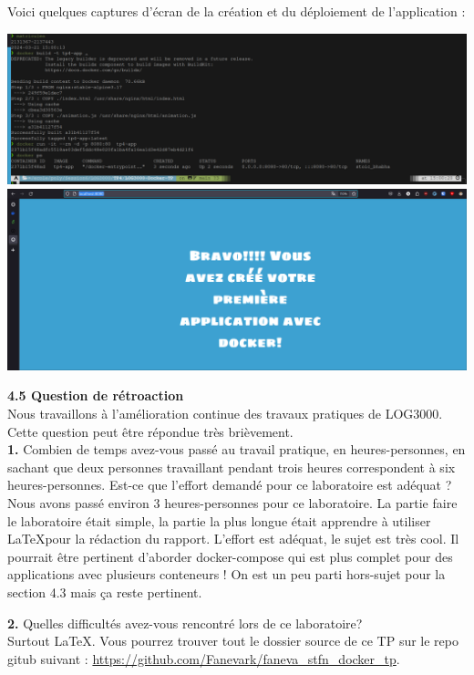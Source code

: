 \documentclass[12pt, letterpaper]{report}
\begin{document}
Voici quelques captures d'écran de la création et du déploiement de l'application : \\ 
\begin{center}
	\includegraphics[scale=0.25]{4.4-all.png} \\
	\includegraphics[scale=0.25]{4.4-app.png} \\
\end{center}
\newpage

\textbf{4.5 Question de rétroaction}\\
Nous travaillons à l’amélioration continue des travaux pratiques de LOG3000. Cette question peut être répondue très brièvement.\\
\textbf{1.} Combien de temps avez-vous passé au travail pratique, en heures-personnes, en sachant que deux personnes travaillant pendant trois heures correspondent à six heures-personnes. Est-ce que l'effort demandé pour ce laboratoire est adéquat ?\\
Nous avons passé environ 3 heures-personnes pour ce laboratoire. La partie faire le laboratoire était simple, la partie la plus longue était apprendre à utiliser \LaTeX pour la rédaction du rapport. L'effort est adéquat, le sujet est très cool. Il pourrait être pertinent d'aborder docker-compose qui est plus complet pour des applications avec plusieurs conteneurs ! 
On est un peu parti hors-sujet pour la section 4.3 mais ça reste pertinent. 
\newline

\textbf{2.} Quelles difficultés avez-vous rencontré lors de ce laboratoire?\\
Surtout \LaTeX.
\newline
\newline
Vous pourrez trouver tout le dossier source de ce TP sur le repo gitub suivant : \url{https://github.com/Fanevark/faneva_stfn_docker_tp}.
\end{document}
